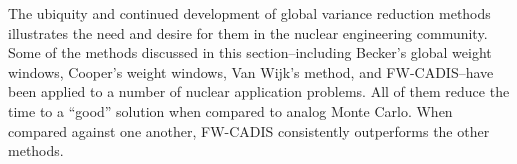 The ubiquity and continued development of global variance reduction methods
illustrates the need and desire for them in the nuclear engineering community.
Some of the
methods discussed in this section--including Becker's global weight windows,
Cooper's weight windows, Van Wijk's method, and FW-CADIS--have
been applied to a number of nuclear
application problems. All of them reduce the time to a ``good'' solution when
compared to analog Monte Carlo. When compared against one another, FW-CADIS
consistently outperforms the other methods.
